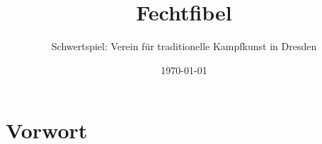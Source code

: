 \VariantDocumentClass

\usepackage[T1]{fontenc}
\usepackage{lmodern}
\usepackage[ngerman]{babel}

\usepackage{graphicx}
\graphicspath{{Images/}}
\usepackage{xcolor}
\usepackage{tikz}
\usepackage{soul}

\usepackage{longtable}
\setlongtables
\setlength{\LTpre}{5pt}
\setlength{\LTpost}{0pt}
\usepackage{multicol}
\usepackage{enumerate}

\usepackage{float}

\usepackage[pass]{geometry}

\usepackage{fancyhdr}
\pagestyle{fancy}
\fancyhead[L]{\textsf{\rightmark}} %
\fancyhead[R]{\textsf{\leftmark}} %
\fancyfoot[C]{\textbf{\textsf{\thepage}}} %
\renewcommand{\headrulewidth}{1.4pt} %
\renewcommand{\footrulewidth}{1.4pt} %

\newcommand{\liniert}[2][0.5cm]{
    \begin{tikzpicture}[gray]
        \path[use as bounding box](0,0)rectangle(\linewidth,-#2*#1-0.5\pgflinewidth);
        \foreach \n in {1,...,#2}\draw(0 ,-#1*\n )--(\linewidth,-#1*\n );
    \end{tikzpicture}}

\VariantAdditionalHeader

\title{Fechtfibel}
\author{Schwertspiel: Verein für traditionelle Kampfkunst in Dresden}
\date{\today}



\VariantTitlePage

\newpage
\setcounter{page}{1}

\section*{Vorwort}

